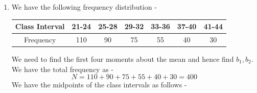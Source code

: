\begin{enumerate}
    \begin{enumerate}
        \item $\mu_2$:
        \[\mu_2 = \frac{\sum f_i (x_i - \mu)^2}{N}\]
        \[= \frac{1 \cdot 16 + 8 \cdot 9 + 28 \cdot 4 + 56 \cdot 1 + 70 \cdot 0 + 56 \cdot 1 + 28 \cdot 4 + 8 \cdot 9 + 1 \cdot 16}{256}\]
        \[= \frac{16 + 72 + 112 + 56 + 0 + 56 + 112 + 72 + 16}{256} = \frac{512}{256} = 2\]
        \[\boxed{\mu_2 = 2
        }\]
        \item $\mu_3$:
        \[\mu_3 = \frac{\sum f_i (x_i - \mu)^3}{N}\]
        \[= \frac{1 \cdot (-64) + 8 \cdot (-27) + 28 \cdot (-8) + 56 \cdot (-1) + 70 \cdot 0 + 56 \cdot 1 + 28 \cdot 8 + 8 \cdot 27 + 1 \cdot 64}{256}\]
        \[= \frac{-64 - 216 - 224 - 56 + 0 + 56 + 224 + 216 + 64}{256} = \frac{0}{256} = 0\]
        \[\boxed{\mu_3 = 0
        }\]
        \item $\mu_4$:
        \[\mu_4 = \frac{\sum f_i (x_i - \mu)^4}{N}\]
        \[= \frac{1 \cdot 256 + 8 \cdot 81 + 28 \cdot 16 + 56 \cdot 1 + 70 \cdot 0 + 56 \cdot 1 + 28 \cdot 16 + 8 \cdot 81 + 1 \cdot 256}{256}\]
        \[= \frac{256 + 648 + 448 + 56 + 0 + 56 + 448 + 648 + 256}{256} = \frac{2816}{256} = 11\]
        \[\boxed{\mu_4 = 11
        }\]
        \item $b_1, b_2$:
        We have the formula for coefficient of skewness as -
        \[b_1 = \frac{\mu_3^2}{\mu_2^3} = \frac{0^2}{2^3} = 0\]
        \[\boxed{b_1 = 0
        }\]
        We have the formula for coefficient of kurtosis as -
        \[b_2 = \frac{\mu_4}{\mu_2^2} = \frac{11}{2^2} = \frac{11}{4} = 2.75\]
        \[\boxed{b_2 = 2.75
        }\]
    \end{enumerate}
    \item We have the following frequency distribution -
    \begin{center}
        \begin{tabular}{|c|cccccc|}
            \hline 
            Class Interval & 21-24 & 25-28 & 29-32 & 33-36 & 37-40 & 41-44 \\
            \hline
            Frequency & 110 & 90 & 75 & 55 & 40 & 30 \\
            \hline
        \end{tabular}
    \end{center}
    We need to find the first four moments about the mean and hence find $b_1, b_2$.
    We have the total frequency as -
    \[N = 110 + 90 + 75 + 55 + 40 + 30 = 400\]
    We have the midpoints of the class intervals as follows -
    \begin{center}

\end{center}
\end{enumerate}
